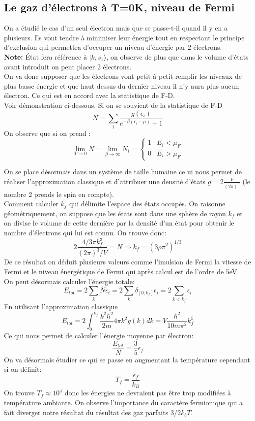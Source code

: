 \subsection{Le gaz d'électrons à T=0K, niveau de Fermi}

On a étudié le cas d'un seul électron mais que se passe-t-il quand il y en a plusieurs. Ils vont tendre à minimiser leur énergie tout en respectant le principe d'exclusion qui permettra d'occuper un niveau d'énergie par 2 électrons. \\
\textbf{Note:} État fera référence à $|k,s_z \rangle$, on observe de plus que dans le volume d'états avant introduit on peut placer 2 électrons. \\
On va donc supposer que les électrons vont petit à petit remplir les niveaux de plus basse énergie et que haut dessus du dernier niveau il n'y aura plus aucun électron. Ce qui est en accord avec la statistique de F-D. \\
Voir démonstration ci-dessous.
Si on se souvient de la statistique de F-D
$$\bar{N}=\sum_i \frac{g(\epsilon_i)}{e^{-\beta (\epsilon_i-\mu)}+1}$$ 
On observe que si on prend :
$$\lim_{T\rightarrow 0}\bar{N}=\lim_{\beta \rightarrow \infty}\bar{N_i}=
\left\{
\begin{array}{cc}
1 & E_i<\mu_F \\
0 & E_i>\mu_F
\end{array}
\right.$$

On se place désormais dans un système de taille humaine ce ui nous permet de réaliser l'approximation classique et d'attribuer une densité d'états $g=2\frac{V}{(2\pi)^3}$ (le nombre 2 prends le spin en compte). \\
Comment calculer $k_f$ qui délimite l'espace des états occupés. On raisonne géométriquement, on suppose que les états sont dans une sphère de rayon $k_f$ et on divise le volume de cette dernière par la densité d'un état pour obtenir le nombre d'électrons qui lui est connu. On trouve donc:
$$2\frac{4/3 \pi k_f^3}{(2\pi)^3/V}=N \Rightarrow k_f=(3\rho \pi^2)^{1/3}$$
De ce résultat on déduit plusieurs valeurs comme l'imulsion de Fermi la vitesse de Fermi et le niveau énergétique de Fermi qui après calcul est de l'ordre de 5eV.\\
On peut désormais calculer l'énergie totale:
$$E_{tot}=2 \sum_{k} \bar{N} \epsilon_i =2 \sum_{k}  \delta_{[0,k_f]} \epsilon_i = 2 \sum_{k<k_f} \epsilon_i $$
En utilisant l'approximation classique 
$$E_{tot}=2 \int_{0}^{k_f} \frac{k^2\hbar^2}{2m}4\pi k^2 g(k) dk
=V\frac{\hbar^2}{10m\pi^2}k_f^5$$
Ce qui nous permet de calculer l'énergie moyenne par électron:
$$\frac{E_{tot}}{N}=\frac{3}{5}\epsilon_f$$
On va désormais étudier ce qui se passe en augmentant la température cependant si on définit:
$$T_f=\frac{\epsilon_f}{k_B}$$ 
On trouve $T_f\approx 10^4$ donc les énergies ne devraient pas être trop modifiées à température ambiante. On observe l'importance du caractère fermionique qui a fait diverger notre résultat du résultat des gaz parfaits $3/2 k_b T$.

